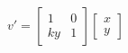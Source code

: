\documentclass[preview]{standalone}
\begin{document}
\begin{align*}
v'=\begin{bmatrix}
                        1 & 0\\
                        ky & 1
                        \end{bmatrix}\begin{bmatrix}
                        x\\
                        y
                        \end{bmatrix}\\
\end{align*}
\end{document}
